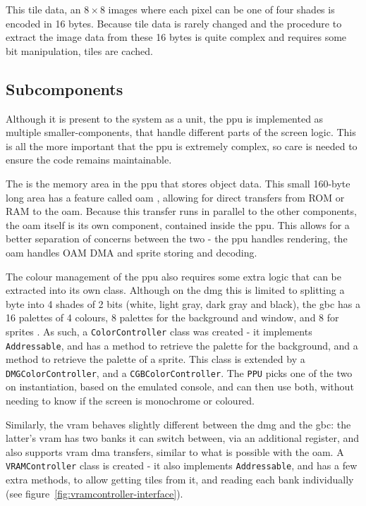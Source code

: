 \documentclass[11pt]{report}
\begin{document}
This tile data, an $8 \times 8$ images where each pixel can be one of four shades is encoded in 16 bytes. Because tile data is rarely changed and the procedure to extract the image data from these 16 bytes is quite complex and requires some bit manipulation, tiles are cached.


\subsection{Subcomponents}

Although it is present to the system as a unit, the \gls{ppu} is implemented as multiple smaller-components, that handle different parts of the screen logic. This is all the more important that the \gls{ppu} is extremely complex, so care is needed to ensure the code remains maintainable.

The  is the memory area in the \gls{ppu} that stores object data. This small 160-byte long area has a feature called \gls{oam} , allowing for direct transfers from ROM or RAM to the \gls{oam}. Because this transfer runs in parallel to the other components, the \gls{oam} itself is its own component, contained inside the \gls{ppu}. This allows for a better separation of concerns between the two - the \gls{ppu} handles rendering, the \gls{oam} handles OAM DMA and sprite storing and decoding.

The colour management of the \gls{ppu} also requires some extra logic that can be extracted into its own class. Although on the \gls{dmg} this is limited to splitting a byte into 4 shades of 2 bits (white, light gray, dark gray and black), the \gls{gbc} has a 16 palettes of 4 colours, 8 palettes for the background and window, and 8 for sprites \cite[Palettes]{pandoc}. As such, a \texttt{ColorController} class was created - it implements \texttt{Addressable}, and has a method to retrieve the palette for the background, and a method to retrieve the palette of a sprite. This class is extended by a \texttt{DMGColorController}, and a \texttt{CGBColorController}. The \texttt{PPU} picks one of the two on instantiation, based on the emulated console, and can then use both, without needing to know if the screen is monochrome or coloured.

Similarly, the \gls{vram} behaves slightly different between the \gls{dmg} and the \gls{gbc}: the latter's \gls{vram} has two banks it can switch between, via an additional register, and also supports \gls{vram} \gls{dma} transfers, similar to what is possible with the \gls{oam}. A \texttt{VRAMController} class is created - it also implements \texttt{Addressable}, and has a few extra methods, to allow getting tiles from it, and reading each bank individually (see figure~\ref{fig:vramcontroller-interface}).
\end{document}
